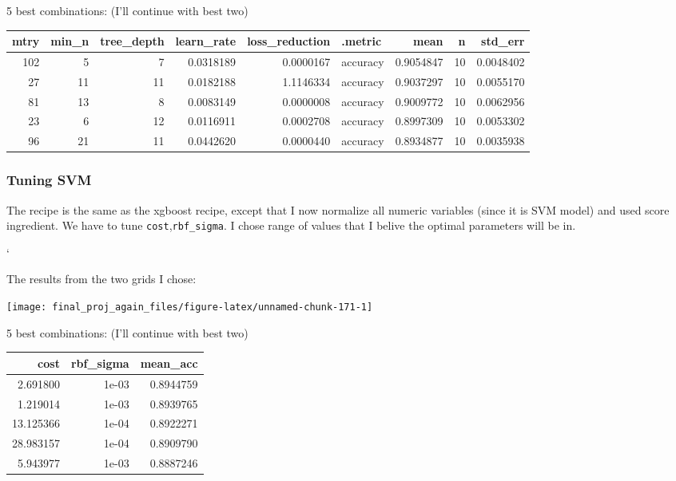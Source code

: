 \documentclass[
]{article}
\begin{document}
5 best combinations: (I'll continue with best two)

\begin{table}[H]
\centering\begingroup\fontsize{9}{11}\selectfont

\begin{tabular}{rrrrrlrrr}
\toprule
mtry & min\_n & tree\_depth & learn\_rate & loss\_reduction & .metric & mean & n & std\_err\\
\midrule
\rowcolor{gray!6}  102 & 5 & 7 & 0.0318189 & 0.0000167 & accuracy & 0.9054847 & 10 & 0.0048402\\
27 & 11 & 11 & 0.0182188 & 1.1146334 & accuracy & 0.9037297 & 10 & 0.0055170\\
\rowcolor{gray!6}  81 & 13 & 8 & 0.0083149 & 0.0000008 & accuracy & 0.9009772 & 10 & 0.0062956\\
23 & 6 & 12 & 0.0116911 & 0.0002708 & accuracy & 0.8997309 & 10 & 0.0053302\\
\rowcolor{gray!6}  96 & 21 & 11 & 0.0442620 & 0.0000440 & accuracy & 0.8934877 & 10 & 0.0035938\\
\bottomrule
\end{tabular}
\endgroup{}
\end{table}

\hypertarget{tuning-svm}{%
\subsubsection{Tuning SVM}\label{tuning-svm}}

The recipe is the same as the xgboost recipe, except that I now
normalize all numeric variables (since it is SVM model) and used score
ingredient. We have to tune \texttt{cost},\texttt{rbf\_sigma}. I chose
range of values that I belive the optimal parameters will be in.

`

The results from the two grids I chose:

\begin{center}\texttt{[image: final\_proj\_again\_files/figure-latex/unnamed-chunk-171-1]} \end{center}

5 best combinations: (I'll continue with best two)

\begin{table}[H]
\centering\begingroup\fontsize{9}{11}\selectfont

\begin{tabular}{rrr}
\toprule
cost & rbf\_sigma & mean\_acc\\
\midrule
\rowcolor{gray!6}  2.691800 & 1e-03 & 0.8944759\\
1.219014 & 1e-03 & 0.8939765\\
\rowcolor{gray!6}  13.125366 & 1e-04 & 0.8922271\\
28.983157 & 1e-04 & 0.8909790\\
\rowcolor{gray!6}  5.943977 & 1e-03 & 0.8887246\\
\bottomrule
\end{tabular}
\endgroup{}
\end{table}
\end{document}
